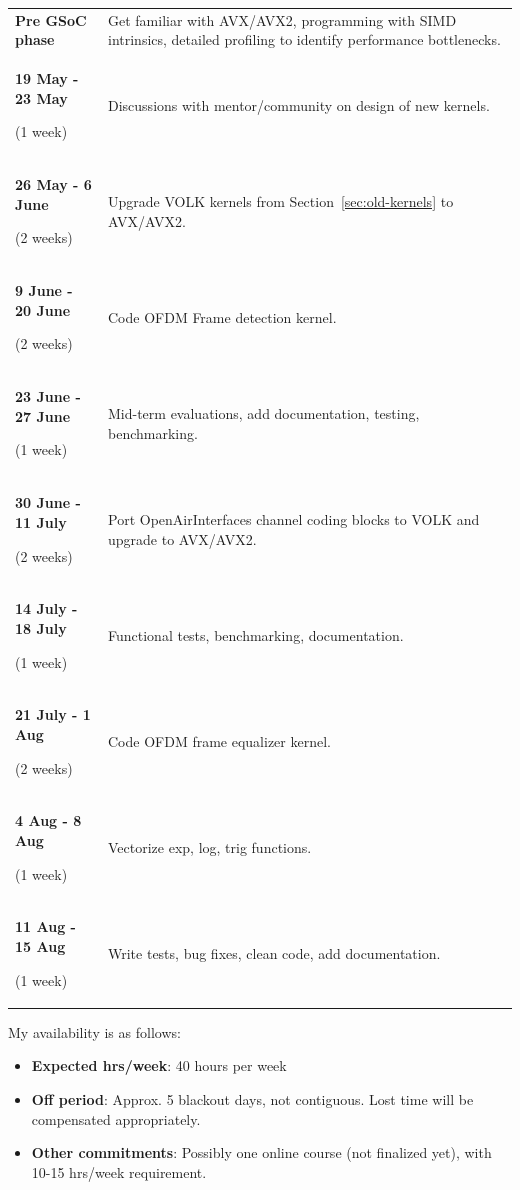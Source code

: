 \documentclass[a4paper,12pt,oneside]{article}
\begin{document}
\begin{table}[H]
\centering
\begin{tabular}{>{\bfseries}p{3.8cm} p{10.2cm}}
\hline
Pre GSoC phase & Get familiar with AVX/AVX2, programming with SIMD intrinsics, detailed profiling to identify performance bottlenecks. \\ 
19 May - 23 May \par \textnormal{(1 week)} & Discussions with mentor/community on design of new kernels. \\
26 May - 6 June \par \textnormal{(2 weeks)} & Upgrade VOLK kernels from Section~\ref{sec:old-kernels} to AVX/AVX2. \\
9 June - 20 June \par \textnormal{(2 weeks)} & Code OFDM Frame detection kernel. \\ 
23 June - 27 June \par \textnormal{(1 week)} & Mid-term evaluations, add documentation, testing, benchmarking. \\ 
30 June - 11 July \par \textnormal{(2 weeks)} & Port OpenAirInterfaces channel coding blocks to VOLK and upgrade to AVX/AVX2. \\ 
14 July - 18 July \par \textnormal{(1 week)} & Functional tests, benchmarking, documentation. \\ 
21 July - 1 Aug \par \textnormal{(2 weeks)} & Code OFDM frame equalizer kernel. \\ 
4 Aug - 8 Aug \par \textnormal{(1 week)} & Vectorize exp, log, trig functions. \\ 
11 Aug - 15 Aug \par \textnormal{(1 week)} & Write tests, bug fixes, clean code, add documentation. \\ 
\hline
\end{tabular}
\end{table}

My availability is as follows:

\begin{itemize}
\item \textbf{Expected hrs/week}: 40 hours per week
\item \textbf{Off period}: Approx. 5 blackout days, not contiguous. Lost time will be compensated appropriately.
\item \textbf{Other commitments}: Possibly one online course (not finalized yet), with 10-15 hrs/week requirement.
\end{itemize}
\end{document}
